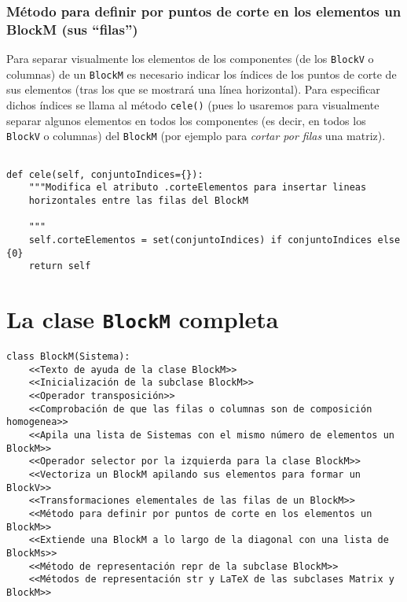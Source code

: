 \documentclass[11pt]{report}
\begin{document}
\subsubsection{Método para definir por puntos de corte en los elementos un BlockM (sus ``filas'')}
\label{sec:org252ee5a}

Para separar visualmente los elementos de los componentes (de los
\texttt{BlockV} o columnas) de un \texttt{BlockM} es necesario indicar los índices
de los puntos de corte de sus elementos (tras los que se mostrará una
línea horizontal). Para especificar dichos índices se llama al método
\texttt{cele()} (pues lo usaremos para visualmente separar algunos elementos
en todos los componentes (es decir, en todos los \texttt{BlockV} o columnas)
del \texttt{BlockM} (por ejemplo para \emph{cortar por filas} una matriz).

\begin{verbatim}

def cele(self, conjuntoIndices={}):
    """Modifica el atributo .corteElementos para insertar lineas
    horizontales entre las filas del BlockM

    """
    self.corteElementos = set(conjuntoIndices) if conjuntoIndices else {0}
    return self

\end{verbatim}


\clearpage

\section{La clase \texttt{BlockM} completa}
\label{sec:org98afd46}

\begin{verbatim}
class BlockM(Sistema):
    <<Texto de ayuda de la clase BlockM>>
    <<Inicialización de la subclase BlockM>>
    <<Operador transposición>>
    <<Comprobación de que las filas o columnas son de composición homogenea>>
    <<Apila una lista de Sistemas con el mismo número de elementos un BlockM>>
    <<Operador selector por la izquierda para la clase BlockM>>
    <<Vectoriza un BlockM apilando sus elementos para formar un BlockV>>
    <<Transformaciones elementales de las filas de un BlockM>>
    <<Método para definir por puntos de corte en los elementos un BlockM>>
    <<Extiende una BlockM a lo largo de la diagonal con una lista de BlockMs>>
    <<Método de representación repr de la subclase BlockM>>
    <<Métodos de representación str y LaTeX de las subclases Matrix y BlockM>>
\end{verbatim}
\end{document}
